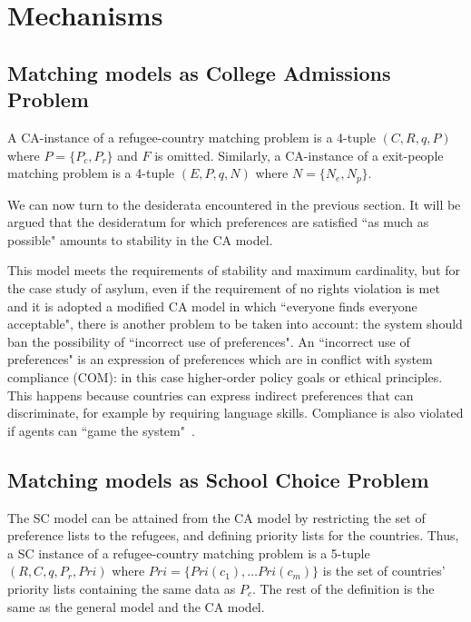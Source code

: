 \section{Mechanisms}\label{mechanisms}%


\subsection{Matching models as College Admissions Problem}\label{matching-model-as-college-admissions-problem}%

A CA-instance of a refugee-country matching problem is a 4-tuple \((C, R, q, P)\) where \(P = \{P_c, P_r\}\) and \(F\) is omitted.
Similarly, a CA-instance of a exit-people matching problem is a 4-tuple \((E, P, q, N)\) where \(N = \{N_e ,  N_p\}\).

We can now turn to the desiderata encountered in the previous section.
It will be argued that the desideratum for which preferences are satisfied “as much as possible" amounts to stability in the CA
model.

This model meets the requirements of stability and maximum cardinality, but for the case study of asylum, even if the requirement of no rights violation is met and it is adopted a modified CA model in which “everyone finds everyone acceptable", there is another problem to be taken into account: the system should ban the possibility of “incorrect use of preferences".
An “incorrect use of preferences" is an expression of preferences which are in conflict with system compliance (COM): in this case higher-order policy goals or ethical principles.
This happens because countries can express indirect preferences that can discriminate, for example by requiring language skills.
Compliance is also violated if agents can “game the system"~\cite{basshuysen}.


\subsection{Matching models as School Choice Problem}\label{matching-model-as-school-choice-problem}%

The SC model can be attained from the CA model by restricting the set of preference lists to the refugees, and defining priority lists for the countries.
Thus, a SC instance of a refugee-country matching problem is a 5-tuple \((R, C, q, P_r, Pri)\) where \(Pri = \{Pri(c_1), \ldots Pri(c_m)\}\) is the set of countries’ priority lists containing the same data as \(P_c\).
The rest of the definition is the same as the general model and the CA model.

